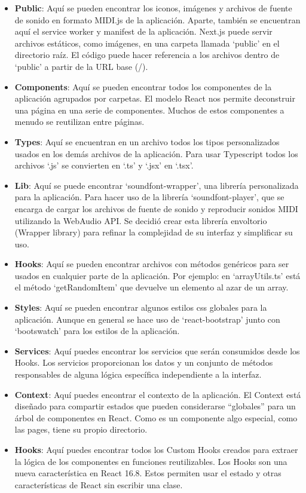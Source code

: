 \documentclass[12pt,twoside,titlepage]{report}
\begin{document}
\begin{itemize}
    \item \textbf{Public}: Aquí se pueden encontrar los iconos, imágenes y archivos de fuente de sonido en formato MIDI.js de la aplicación. Aparte, también se encuentran aquí el service worker y manifest de la aplicación. Next.js puede servir archivos estáticos, como imágenes, en una carpeta llamada ‘public’ en el directorio raíz. El código puede hacer referencia a los archivos dentro de ‘public’ a partir de la URL base (/).
    \item \textbf{Components}: Aquí se pueden encontrar todos los componentes de la aplicación agrupados por carpetas. El modelo React nos permite deconstruir una página en una serie de componentes. Muchos de estos componentes a menudo se reutilizan entre páginas.
    \item \textbf{Types}: Aquí se encuentran en un archivo todos los tipos personalizados usados en los demás archivos de la aplicación. Para usar Typescript todos los archivos ‘.js’ se convierten en ‘.ts’ y ‘.jsx’ en ‘.tsx’.
    \item \textbf{Lib}: Aquí se puede encontrar ‘soundfont-wrapper’, una librería personalizada para la aplicación. Para hacer uso de la librería ‘soundfont-player’, que se encarga de cargar los archivos de fuente de sonido y reproducir sonidos MIDI utilizando la WebAudio API. Se decidió crear esta librería envoltorio (Wrapper library) para refinar la complejidad de su interfaz y simplificar su uso.
    \item \textbf{Hooks}: Aquí se pueden encontrar archivos con métodos genéricos para ser usados en cualquier parte de la aplicación. Por ejemplo: en ‘arrayUtils.ts’ está el método ‘getRandomItem’ que devuelve un elemento al azar de un array.
    \item \textbf{Styles}: Aquí se pueden encontrar algunos estilos css globales para la aplicación. Aunque en general se hace uso de ‘react-bootstrap’ junto con ‘bootswatch’ para los estilos de la aplicación.
    \item \textbf{Services}: Aquí puedes encontrar los servicios que serán consumidos desde los Hooks. Los servicios proporcionan los datos y un conjunto de métodos responsables de alguna lógica específica independiente a la interfaz.
    \item \textbf{Context}: Aquí puedes encontrar el contexto de la aplicación. El Context está diseñado para compartir estados que pueden considerarse “globales” para un árbol de componentes en React. Como es un componente algo especial, como las pages, tiene su propio directorio.
    \item \textbf{Hooks}: Aquí puedes encontrar todos los Custom Hooks creados para extraer la lógica de los componentes en funciones reutilizables. Los Hooks son una nueva característica en React 16.8. Estos permiten usar el estado y otras características de React sin escribir una clase.
\end{itemize}
\end{document}
